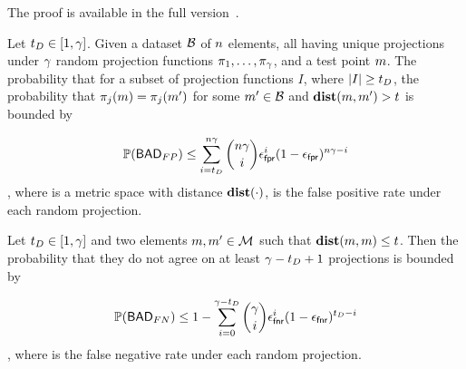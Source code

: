 The proof is available in the full version~\cite{code}. 


\iffalse 
\begin{corollary}
 \label{eq:false_pos_bound} 
Let $t_{D} \in [1, \gamma]$. Given a dataset $\blocklist$ of $n$ elements, all having unique projections under $\gamma$ random projection functions $\projFn[1], \dots, \projFn[\numProjections]$, and a  test point $\genericMetricSpaceElmt$. The probability that for a subset of projection functions $I$, where $\left|{I}\right| \ge t_{D}$, the probability that $\projFn[\projIdx](\genericMetricSpaceElmt) = \projFn[\projIdx](\genericMetricSpaceElmt')$ for some $\genericMetricSpaceElmt' \in \blocklist$ and $\distanceNotation[\distance][\genericMetricSpaceElmt][\genericMetricSpaceElmtAlt] > 
			\threshold$ is bounded by 


\[			 \mathbb{P}\mathopen{}\left({\mathsf{BAD}_{FP}}\right)\mathclose{}
 \le \sum\limits_{i = t_{D}}^{n \gamma} \binom{n\gamma}{i} \epsilon_\mathsf{fpr}^{i} (1 - \epsilon_\mathsf{fpr})^{n \gamma - i}
\]
, where  \metricSpace is a metric space with distance $\distanceNotation[\distance][\cdot]$, \fpr is the false positive rate under each random projection.
\end{corollary}


\begin{corollary}
 \label{eq:false_neg_bound}
Let $t_{D} \in [1, \gamma]$ and two elements $\genericMetricSpaceElmt, \genericMetricSpaceElmtAlt \in \metricSpace$ such that $\hammingDist{\genericMetricSpaceElmt}{\genericMetricSpaceElmt} \le \threshold$. Then the probability that they do not agree on at least $\gamma - t_{D} + 1$ projections is bounded by 

\[	
\mathbb{P}\mathopen{}\left({\mathsf{BAD}_{FN}}\right)\mathclose{} \le 1 - \sum\limits_{i = 0}^{\gamma - t_{D}} \binom{\gamma}{i} \epsilon_\mathsf{fnr}^{i} (1 - \epsilon_\mathsf{fnr})^{t_{D} - i}
\]
, where \fnr is the false negative rate under each random projection.

\end{corollary}


